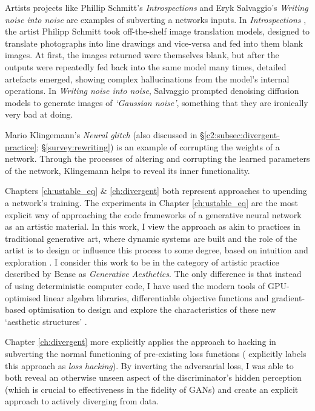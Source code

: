 Artists projects like Phillip Schmitt's \textit{Introspections} \citep{schmitt2019introspections} and Eryk Salvaggio's \textit{Writing noise into noise} \citep{salvaggio2023noise} are examples of subverting a networks inputs. 
In \textit{Introspections} \cite{schmitt2019introspections}, the artist Philipp Schmitt took off-the-shelf image translation models, designed to translate photographs into line drawings and vice-versa and fed into them blank images. At first, the images returned were themselves blank, but after the outputs were repeatedly fed back into the same model many times, detailed artefacts emerged, showing complex hallucinations from the model's internal operations.
In \textit{Writing noise into noise}, Salvaggio prompted denoising diffusion models \cite{sohl2015deep} to generate images of \textit{`Gaussian noise'}, something that they are ironically very bad at doing.

Mario Klingemann's \textit{Neural glitch} (also discussed in \S \ref{c2:subsec:divergent-practice}; \S \ref{survey:rewriting}) is an example of corrupting the weights of a network. 
Through the processes of altering and corrupting the learned parameters of the network, Klingemann helps to reveal its inner functionality.

Chapters \ref{ch:ustable_eq} \& \ref{ch:divergent} both represent approaches to upending a network's training. 
The experiments in Chapter \ref{ch:ustable_eq} are the most explicit way of approaching the code frameworks of a generative neural network as an artistic material.
In this work, I view the approach as akin to practices in traditional generative art, where dynamic systems are built and the role of the artist is to design or influence this process to some degree, based on intuition and exploration \cite{mccormack2004generative}.
I consider this work to be in the category of artistic practice described by Bense as \textit{Generative Aesthetics}.
The only difference is that instead of using deterministic computer code, I have used the modern tools of GPU-optimised linear algebra libraries, differentiable objective functions and gradient-based optimisation to design and explore the characteristics of these new `aesthetic structures' \cite{bense1965projekte}.

Chapter \ref{ch:divergent} more explicitly applies the approach to hacking in subverting the normal functioning of pre-existing loss functions (\cite{berns2020bridging} explicitly labels this approach as \textit{loss hacking}).
By inverting the adversarial loss, I was able to both reveal an otherwise unseen aspect of the discriminator's hidden perception (which is crucial to effectiveness in the fidelity of GANs) and create an explicit approach to actively diverging from data.

